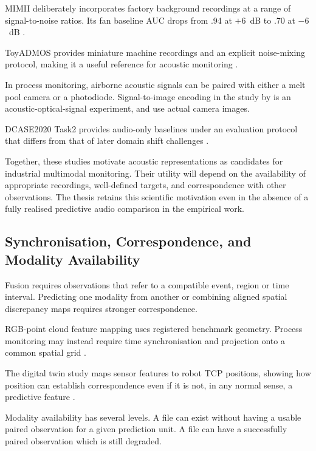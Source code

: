MIMII deliberately incorporates factory background recordings at a range of signal-to-noise ratios.
Its fan baseline AUC drops from .94 at $+6$~dB to .70 at $-6$~dB \parencite[Table~3]{Purohit2019MIMII}.

ToyADMOS provides miniature machine recordings and an explicit noise-mixing protocol, making it a
useful reference for acoustic monitoring \parencite{Koizumi2019ToyADMOS}.

In process monitoring, airborne acoustic signals can be paired with either a melt pool camera or a
photodiode. Signal-to-image encoding in the study by \textcite{Li2022A} is an acoustic-optical-signal experiment,
and \textcite{Xie2025Audiovisual} use actual camera images.

DCASE2020 Task2 provides audio-only baselines under an evaluation protocol that differs from that of
later domain shift challenges \parencite{Koizumi2020Description}.

Together, these studies motivate acoustic representations as candidates for industrial multimodal
monitoring. Their utility will depend on the availability of appropriate recordings, well-defined
targets, and correspondence with other observations. The thesis retains this scientific motivation
even in the absence of a fully realised predictive audio comparison in the empirical work.

\subsection{Synchronisation, Correspondence, and Modality Availability}

Fusion requires observations that refer to a compatible event, region or time interval. Predicting
one modality from another or combining aligned spatial discrepancy maps requires stronger
correspondence.

RGB-point cloud feature mapping uses registered benchmark geometry. Process monitoring may instead
require time synchronisation and projection onto a common spatial grid
\parencite{Costanzino2024Multimodal,Petrich2021Multimodal}.

The digital twin study maps sensor features to robot TCP positions, showing how position can
establish correspondence even if it is not, in any normal sense, a predictive feature
\parencite{Chen2023Multisensor}.

Modality availability has several levels. A file can exist without having a usable paired
observation for a given prediction unit. A file can have a successfully paired observation which is
still degraded.

